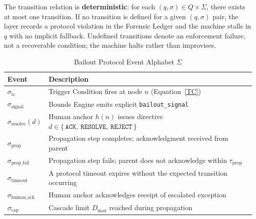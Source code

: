 The transition relation is \textbf{deterministic}: for each $(q, \sigma) \in Q \times \Sigma$, there exists at most one transition. If no transition is defined for a given $(q, \sigma)$ pair, the \fact{} layer records a protocol violation in the Forensic Ledger and the machine stalls in $q$ with no implicit fallback. Undefined transitions denote an enforcement failure, not a recoverable condition; the machine halts rather than improvises.

\begin{table}[t]
\caption{Bailout Protocol Event Alphabet $\Sigma$}
\label{tab:bp-events}
\medskip
\noindent\begin{tabular}{lp{8.0cm}}
\toprule
\textbf{Event} & \textbf{Description} \\
\midrule
$\sigma_{\text{tc}}$        & Trigger Condition fires at node $n$ (Equation~\ref{TC}) \\
$\sigma_{\text{signal}}$    & Bounds Engine emits explicit \texttt{bailout\_signal} \\
$\sigma_{\text{resolve}}(d)$ & Human anchor $h(n)$ issues directive $d \in \{\,\texttt{ACK},\ \texttt{RESOLVE},\ \texttt{REJECT}\,\}$ \\
$\sigma_{\text{prop}}$       & Propagation step completes; acknowledgment received from parent \\
$\sigma_{\text{prop\_fail}}$ & Propagation step fails; parent does not acknowledge within $\tau_{\text{prop}}$ \\
$\sigma_{\text{timeout}}$    & A protocol timeout expires without the expected transition occurring \\
$\sigma_{\text{human\_ack}}$ & Human anchor acknowledges receipt of escalated exception \\
$\sigma_{\text{cap}}$        & Cascade limit $D_{\max}$ reached during propagation \\
\bottomrule
\end{tabular}
\end{table}

